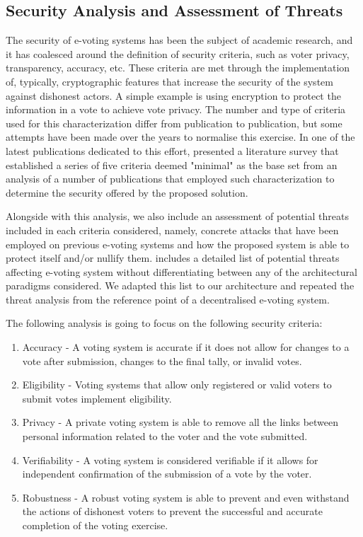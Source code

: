 \documentclass[../main.tex]{subfiles}
\begin{document}
    \subsection{Security Analysis and Assessment of Threats}
        The security of e-voting systems has been the subject of academic research, and it has coalesced around the definition of security criteria, such as voter privacy, transparency, accuracy, etc. These criteria are met through the implementation of, typically, cryptographic features that increase the security of the system against dishonest actors. A simple example is using encryption to protect the information in a vote to achieve vote privacy. The number and type of criteria used for this characterization differ from publication to publication, but some attempts have been made over the years to normalise this exercise. In one of the latest publications dedicated to this effort, \cite{Almeida2023} presented a literature survey that established a series of five criteria deemed "minimal" as the base set from an analysis of a number of publications that employed such characterization to determine the security offered by the proposed solution.
        \par
        Alongside with this analysis, we also include an assessment of potential threats included in each criteria considered, namely, concrete attacks that have been employed on previous e-voting systems and how the proposed system is able to protect itself and/or nullify them. \cite{Zissi2011} includes a detailed list of potential threats affecting e-voting system without differentiating between any of the architectural paradigms considered. We adapted this list to our architecture and repeated the threat analysis from the reference point of a decentralised e-voting system. 
        \par
        The following analysis is going to focus on the following security criteria:
        \begin{enumerate}
            \item{Accuracy - A voting system is accurate if it does not allow for changes to a vote after submission, changes to the final tally, or invalid votes.}
            \item{Eligibility - Voting systems that allow only registered or valid voters to submit votes implement eligibility.}
            \item{Privacy - A private voting system is able to remove all the links between personal information related to the voter and the vote submitted.}
            \item{Verifiability - A voting system is considered verifiable if it allows for independent confirmation of the submission of a vote by the voter.}
            \item{Robustness - A robust voting system is able to prevent and even withstand the actions of dishonest voters to prevent the successful and accurate completion of the voting exercise.}
        \end{enumerate}
\end{document}
